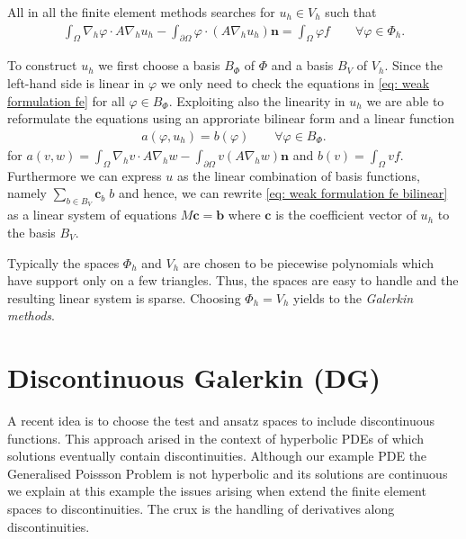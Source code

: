 All in all the finite element methods searches for $u_h \in V_h$ such that 
\begin{align}
	\int_\Omega \nabla_h \varphi  \cdot A\nabla_h u_h -\int_{\partial \Omega} \varphi  \cdot (A\nabla_h u_h) \mathbf{n}  = \int_\Omega \varphi f \qquad \forall \varphi \in \Phi_h. \label{eq: weak formulation fe}
\end{align}

To construct $u_h$ we first choose a basis $B_{\Phi}$ of $\Phi$ and a basis $B_V$ of $V_h$.
Since the left-hand side is linear in $\varphi$ we only need to check the equations in \eqref{eq: weak formulation fe} for all $\varphi \in B_{\Phi}$. Exploiting also the linearity in $u_h$  we are able to reformulate the equations using an approriate bilinear form and a linear function
\begin{align}
	a(\varphi,u_h)  =b(\varphi) \qquad \forall \varphi \in B_{\Phi}. \label{eq: weak formulation fe bilinear}
\end{align}
for $a(v,w)= \int_\Omega \nabla_h v  \cdot A\nabla_h w -\int_{\partial \Omega} v (A\nabla_h w)\mathbf{n}$ and $b(v) = \int_\Omega v f$.\\
Furthermore we can express $u$ as the linear combination of basis functions, namely $\sum_{b \in B_V} \mathbf{c}_b \; b$ and hence, we can rewrite \eqref{eq: weak formulation fe bilinear} as a linear system of equations $M \mathbf{c} = \mathbf{b}$ where  $\mathbf{c}$ is the coefficient vector of $u_h$ to the basis $B_V$.  

Typically the spaces $\Phi_h$ and $V_h$ are chosen to be piecewise polynomials which have support only on a few triangles. Thus, the spaces are easy to handle and the resulting linear system is sparse.
Choosing $\Phi_h = V_h$ yields to the \emph{Galerkin methods}.

\section{Discontinuous Galerkin (DG)} \label{sec: SIPG}
A recent idea is to choose the test and ansatz spaces to include discontinuous functions. This approach arised in the context of hyperbolic PDEs of which solutions eventually contain discontinuities. Although our example PDE the Generalised Poissson Problem is not hyperbolic and its solutions are continuous we explain at this example the issues arising when extend the finite element spaces to discontinuities. The crux is the handling of derivatives along discontinuities.

